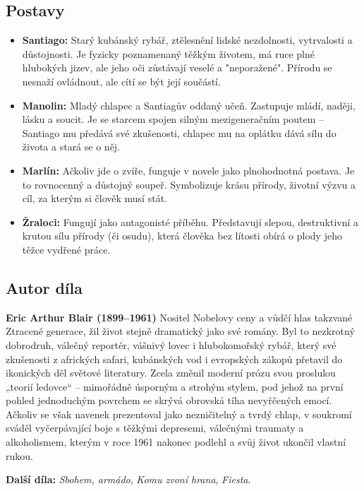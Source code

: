 \documentclass[12pt, a4paper]{article}
\begin{document}
\subsection*{Postavy}
\begin{itemize}[itemsep=0.3em]
	\item \textbf{Santiago:} Starý kubánský rybář, ztělesnění lidské nezdolnosti, vytrvalosti a důstojnosti. Je fyzicky poznamenaný těžkým životem, má ruce plné hlubokých jizev, ale jeho oči zůstávají veselé a "neporažené". Přírodu se nesnaží ovládnout, ale cítí se být její součástí.
	
	\item \textbf{Manolin:} Mladý chlapec a Santiagův oddaný učeň. Zastupuje mládí, naději, lásku a soucit. Je se starcem spojen silným mezigeneračním poutem – Santiago mu předává své zkušenosti, chlapec mu na oplátku dává sílu do života a stará se o něj.
	
	\item \textbf{Marlín:} Ačkoliv jde o zvíře, funguje v novele jako plnohodnotná postava. Je to rovnocenný a důstojný soupeř. Symbolizuje krásu přírody, životní výzvu a cíl, za kterým si člověk musí stát.
	
	\item \textbf{Žraloci:} Fungují jako antagonisté příběhu. Představují slepou, destruktivní a krutou sílu přírody (či osudu), která člověka bez lítosti obírá o plody jeho těžce vydřené práce.
\end{itemize}

\subsection*{Autor díla}
\textbf{Eric Arthur Blair (1899--1961)}
Nositel Nobelovy ceny a vůdčí hlas takzvané Ztracené generace, žil život stejně dramatický jako své romány. Byl to nezkrotný dobrodruh, válečný reportér, vášnivý lovec i hlubokomořský rybář, který své zkušenosti z afrických safari, kubánských vod i evropských zákopů přetavil do ikonických děl světové literatury. Zcela změnil moderní prózu svou proslulou „teorií ledovce“ – mimořádně úsporným a strohým stylem, pod jehož na první pohled jednoduchým povrchem se skrývá obrovská tíha nevyřčených emocí. Ačkoliv se však navenek prezentoval jako nezničitelný a tvrdý chlap, v soukromí sváděl vyčerpávající boje s těžkými depresemi, válečnými traumaty a alkoholismem, kterým v roce 1961 nakonec podlehl a svůj život ukončil vlastní rukou.

\textbf{Další díla:} \textit{Sbohem, armádo}, \textit{Komu zvoní hrana}, \textit{Fiesta}.
\end{document}
